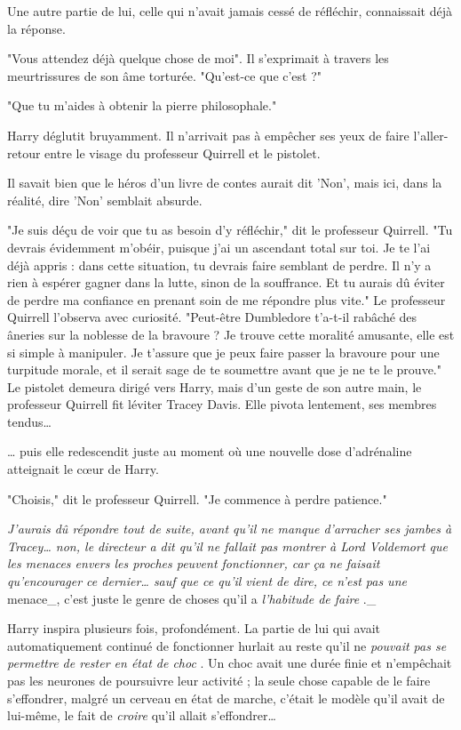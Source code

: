 Une autre partie de lui, celle qui n'avait jamais cessé de réfléchir, connaissait déjà la réponse.

"Vous attendez déjà quelque chose de moi". Il s'exprimait à travers les meurtrissures de son âme torturée. "Qu'est-ce que c'est ?"

"Que tu m'aides à obtenir la pierre philosophale."

Harry déglutit bruyamment. Il n'arrivait pas à empêcher ses yeux de faire l'aller-retour entre le visage du professeur Quirrell et le pistolet.

Il savait bien que le héros d'un livre de contes aurait dit 'Non', mais ici, dans la réalité, dire 'Non' semblait absurde.

"Je suis déçu de voir que tu as besoin d'y réfléchir," dit le professeur Quirrell. "Tu devrais évidemment m'obéir, puisque j'ai un ascendant total sur toi. Je te l'ai déjà appris : dans cette situation, tu devrais faire semblant de perdre. Il n'y a rien à espérer gagner dans la lutte, sinon de la souffrance. Et tu aurais dû éviter de perdre ma confiance en prenant soin de me répondre plus vite." Le professeur Quirrell l'observa avec curiosité. "Peut-être Dumbledore t'a-t-il rabâché des âneries sur la noblesse de la bravoure ? Je trouve cette moralité amusante, elle est si simple à manipuler. Je t'assure que je peux faire passer la bravoure pour une turpitude morale, et il serait sage de te soumettre avant que je ne te le prouve." Le pistolet demeura dirigé vers Harry, mais d'un geste de son autre main, le professeur Quirrell fit léviter Tracey Davis. Elle pivota lentement, ses membres tendus…

… puis elle redescendit juste au moment où une nouvelle dose d'adrénaline atteignait le cœur de Harry.

"Choisis," dit le professeur Quirrell. "Je commence à perdre patience."

\emph{J'aurais dû répondre tout de suite, avant qu'il ne manque d'arracher ses jambes à Tracey… non, le directeur a dit qu'il ne fallait pas montrer à Lord Voldemort que les menaces envers les proches peuvent fonctionner, car ça ne faisait qu'encourager ce dernier… sauf que ce qu'il vient de dire, ce n'est pas une } menace\_, c'est juste le genre de choses qu'il a \emph{l'habitude de faire} .\_

Harry inspira plusieurs fois, profondément. La partie de lui qui avait automatiquement continué de fonctionner hurlait au reste qu'il ne \emph{pouvait pas se permettre de rester en état de choc} . Un choc avait une durée finie et n'empêchait pas les neurones de poursuivre leur activité ; la seule chose capable de le faire s'effondrer, malgré un cerveau en état de marche, c'était le modèle qu'il avait de lui-même, le fait de \emph{croire}  qu'il allait s'effondrer…

